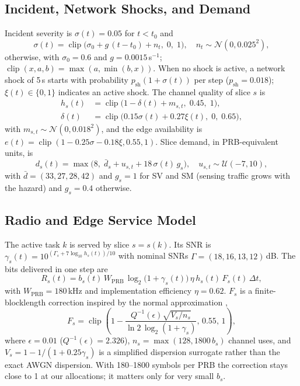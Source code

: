 \documentclass[conference]{IEEEtran}
\DeclareMathOperator{\clip}{clip}
\begin{document}
\subsection{Incident, Network Shocks, and Demand}
Incident severity is $\sigma(t)=0.05$ for $t<t_0$ and
\begin{equation}
\sigma(t)=\clip\big(\sigma_0+g\,(t-t_0)+n_t,\;0,\;1\big),\quad n_t\sim\mathcal{N}(0,0.025^2),
\label{eq:sev}
\end{equation}
otherwise, with $\sigma_0=0.6$ and $g=0.0015$\,s$^{-1}$; $\clip(x,a,b)=\max(a,\min(b,x))$. When no shock is active, a network shock of 5\,s starts with probability $p_{\mathrm{sh}}(1+\sigma(t))$ per step ($p_{\mathrm{sh}}=0.018$); $\xi(t)\in\{0,1\}$ indicates an active shock. The channel quality of slice $s$ is
\begin{equation}
\begin{aligned}
h_s(t)&=\clip\big(1-\delta(t)+m_{s,t},\;0.45,\;1\big),\\
\delta(t)&=\clip\big(0.15\sigma(t)+0.27\xi(t),\;0,\;0.65\big),
\end{aligned}
\label{eq:chan}
\end{equation}
with $m_{s,t}\sim\mathcal{N}(0,0.018^2)$, and the edge availability is $e(t)=\clip(1-0.25\sigma-0.18\xi,0.55,1)$. Slice demand, in PRB-equivalent units, is
\begin{equation}
d_s(t)=\max\big(8,\;\bar d_s+u_{s,t}+18\,\sigma(t)\,g_s\big),\quad u_{s,t}\sim\mathcal{U}(-7,10),
\label{eq:demand}
\end{equation}
with $\bar d=(33,27,28,42)$ and $g_s=1$ for SV and SM (sensing traffic grows with the hazard) and $g_s=0.4$ otherwise.

\subsection{Radio and Edge Service Model}
The active task $k$ is served by slice $s=s(k)$. Its SNR is $\gamma_s(t)=10^{(\Gamma_s+7\log_{10}h_s(t))/10}$ with nominal SNRs $\Gamma=(18,16,13,12)$\,dB. The bits delivered in one step are
\begin{equation}
R_s(t)=b_s(t)\,W_{\mathrm{PRB}}\,\log_2\!\big(1+\gamma_s(t)\big)\,\eta\,h_s(t)\,F_s(t)\,\Delta t,
\label{eq:rate}
\end{equation}
with $W_{\mathrm{PRB}}=180$\,kHz and implementation efficiency $\eta=0.62$. $F_s$ is a finite-blocklength correction inspired by the normal approximation \cite{polyanskiy},
\begin{equation}
F_s=\clip\!\left(1-\frac{Q^{-1}(\epsilon)\sqrt{V_s/n_s}}{\ln 2\,\log_2(1+\gamma_s)},\,0.55,\,1\right),
\label{eq:fbl}
\end{equation}
where $\epsilon=0.01$ ($Q^{-1}(\epsilon)=2.326$), $n_s=\max(128,1800\,b_s)$ channel uses, and $V_s=1-1/(1+0.25\gamma_s)$ is a simplified dispersion surrogate rather than the exact AWGN dispersion. With 180--1800 symbols per PRB the correction stays close to 1 at our allocations; it matters only for very small $b_s$.
\end{document}
